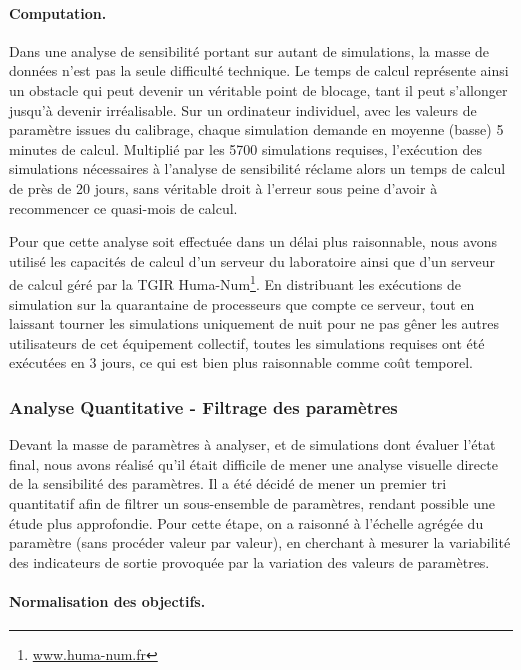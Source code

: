 \paragraph{Computation.}
Dans une analyse de sensibilité portant sur autant de simulations, la masse de données n'est pas la seule difficulté technique.
Le temps de calcul représente ainsi un obstacle qui peut devenir un véritable point de blocage, tant il peut s'allonger jusqu'à devenir irréalisable.
Sur un ordinateur individuel, avec les valeurs de paramètre issues du calibrage, chaque simulation demande en moyenne (basse) 5 minutes de calcul.
Multiplié par les 5700 simulations requises, l'exécution des simulations nécessaires à l'analyse de sensibilité réclame alors un temps de calcul de près de 20 jours, sans véritable droit à l'erreur sous peine d'avoir à recommencer ce quasi-mois de calcul.

Pour que cette analyse soit effectuée dans un délai plus raisonnable, nous avons utilisé les capacités de calcul d'un serveur du laboratoire ainsi que d'un serveur de calcul géré par la TGIR Huma-Num\footnote{
\href{https://www.huma-num.fr}{www.huma-num.fr}
}.
En distribuant les exécutions de simulation sur la quarantaine de processeurs que compte ce serveur, tout en laissant tourner les simulations uniquement de nuit pour ne pas gêner les autres utilisateurs de cet équipement collectif, toutes les simulations requises ont été exécutées en 3 jours, ce qui est bien plus raisonnable comme coût temporel.

\subsubsection{Analyse Quantitative - Filtrage des paramètres}

Devant la masse de paramètres à analyser, et de simulations dont évaluer l'état final, nous avons réalisé qu'il était difficile de mener une analyse visuelle directe de la sensibilité des paramètres.
Il a été décidé de mener un premier tri quantitatif afin de filtrer un sous-ensemble de paramètres, rendant possible une étude plus approfondie.
Pour cette étape, on a raisonné à l'échelle agrégée du paramètre (sans procéder valeur par valeur), en cherchant à mesurer la variabilité des indicateurs de sortie provoquée par la variation des valeurs de paramètres.

\paragraph{Normalisation des objectifs.}

